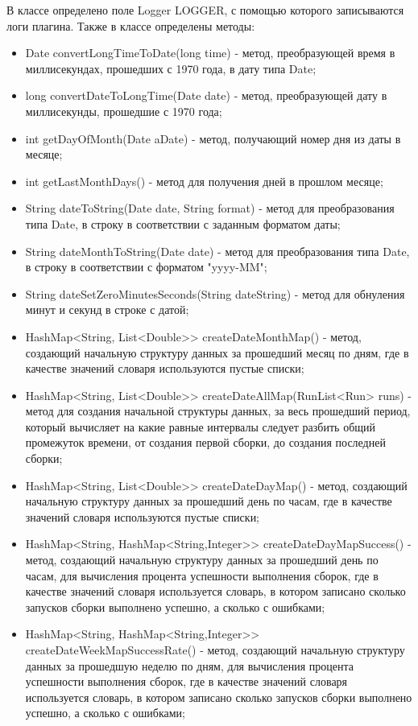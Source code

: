 В классе определено поле Logger LOGGER, с помощью которого записываются логи плагина. Также в классе определены методы:

\begin{itemize}
	\item Date convertLongTimeToDate(long time) - метод, преобразующей время в миллисекундах, прошедших с 1970 года, в дату типа Date;
	\item long convertDateToLongTime(Date date) - метод, преобразующей дату в миллисекунды, прошедшие с 1970 года;
	\item int getDayOfMonth(Date aDate) - метод, получающий номер дня из даты в месяце;
	\item int getLastMonthDays() - метод для получения дней в прошлом месяце;
	\item String dateToString(Date date, String format) - метод для преобразования типа Date, в строку в соответствии с заданным форматом даты;
	\item String dateMonthToString(Date date) - метод для преобразования типа Date, в строку в соответствии с форматом "yyyy-MM";
	\item String dateSetZeroMinutesSeconds(String dateString) - метод для обнуления минут и секунд в строке с датой;
	\item HashMap<String, List<Double>> createDateMonthMap() - метод, создающий начальную структуру данных за прошедший месяц по дням, где в качестве значений словаря используются пустые списки;
	\item HashMap<String, List<Double>> createDateAllMap(RunList<Run> runs) - метод для создания начальной структуры данных, за весь прошедший период, который вычисляет на какие равные интервалы следует разбить общий промежуток времени, от создания первой сборки, до создания последней сборки;
	\item HashMap<String, List<Double>> createDateDayMap() - метод, создающий начальную структуру данных за прошедший день по часам, где в качестве значений словаря используются пустые списки;
	\item HashMap<String, HashMap<String,Integer>> createDateDayMapSuccess() - метод, создающий начальную структуру данных за прошедший день по часам, для вычисления процента успешности выполнения сборок, где в качестве значений словаря используется словарь, в котором записано сколько запусков сборки выполнено успешно, а сколько с ошибками;
	\item HashMap<String, HashMap<String,Integer>> createDateWeekMapSuccessRate() - метод, создающий начальную структуру данных за прошедшую неделю по дням, для вычисления процента успешности выполнения сборок, где в качестве значений словаря используется словарь, в котором записано сколько запусков сборки выполнено успешно, а сколько с ошибками;

\end{itemize}
